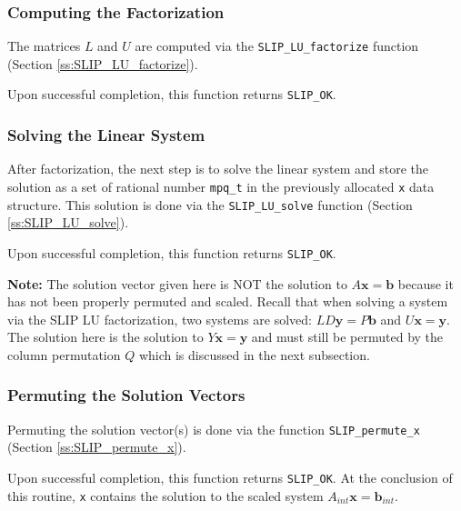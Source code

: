 \documentclass[12pt]{article}
\theoremstyle{definition}
\begin{document}
\subsubsection{Computing the Factorization}

The matrices $L$ and $U$ are computed via the \verb|SLIP_LU_factorize| function
(Section \ref{ss:SLIP_LU_factorize}).

Upon successful completion, this function returns \verb|SLIP_OK|.

\subsubsection{Solving the Linear System}

After factorization, the next step is to solve the linear system and store the
solution as a set of rational number \verb|mpq_t| in the previously allocated
\verb|x| data structure. This solution is done via the \verb|SLIP_LU_solve|
function (Section \ref{ss:SLIP_LU_solve}).

Upon successful completion, this function returns \verb|SLIP_OK|.

\textbf{Note:} The solution vector given here is NOT the solution to $A
\mathbf{x} = \mathbf{b}$ because it has not been properly permuted and scaled.
Recall that when solving a system via the SLIP LU factorization, two systems
are solved: $LD \mathbf{y} = P \mathbf{b}$ and $U \mathbf{x} = \mathbf{y}$. The
solution here is the solution to $Y \mathbf{x} = \mathbf{y}$ and must still be
permuted by the column permutation $Q$ which is discussed in the next
subsection.

\subsubsection{Permuting the Solution Vectors}

Permuting the solution vector(s) is done via the function \verb|SLIP_permute_x|
(Section \ref{ss:SLIP_permute_x}).

Upon successful completion, this function returns \verb|SLIP_OK|. At the
conclusion of this routine, \verb|x| contains the solution to the scaled system
$A_{int} \mathbf{x} = \mathbf{b}_{int}$.
\end{document}
